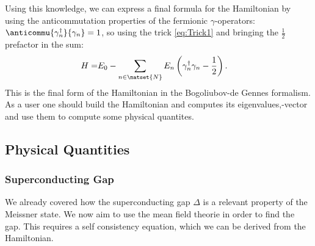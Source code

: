 \documentclass[../main.tex]{subfile}
\begin{document}
Using this knowledge, we can express a final formula for the Hamiltonian by using the anticommutation properties of the fermionic $\gamma$-operators:
 $\anticommu{\gamma^{\dagger}_n}{\gamma_{n}} = 1$, so using the trick \ref{eq:Trick1} and bringing the $\frac{1}{2}$ prefactor in the sum:
\begin{align}
    H =& E_0 - \sum_{n\in \natset{N}} E_n \left( \gamma_n^{\dagger}\gamma_n - \frac{1}{2}\right).
\end{align}
This is the final form of the Hamiltonian in the Bogoliubov-de Gennes formalism. As a user one should build the Hamiltonian 
and computes its eigenvalues,-vector and use them to compute some physical quantites.\\
\subsection{Physical Quantities}
\subsubsection{Superconducting Gap}
We already covered how the superconducting gap $\Delta$ is a relevant property of the Meissner state. We now aim to use the  mean field 
theorie in order to find the gap. This requires a self consistency equation, which we can be derived from the Hamiltonian.\\ 
\end{document}
